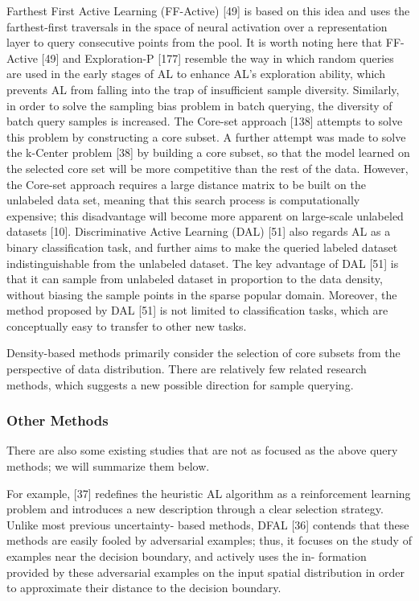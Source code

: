 Farthest First Active Learning (FF-Active) [49] is based on this idea and uses the farthest-first
traversals in the space of neural activation over a representation layer to query consecutive points
from the pool. It is worth noting here that FF-Active [49] and Exploration-P [177] resemble the
way in which random queries are used in the early stages of AL to enhance AL’s exploration
ability, which prevents AL from falling into the trap of insufficient sample diversity. Similarly, in
order to solve the sampling bias problem in batch querying, the diversity of batch query samples
is increased. The Core-set approach [138] attempts to solve this problem by constructing a core
subset. A further attempt was made to solve the k-Center problem [38] by building a core subset,
so that the model learned on the selected core set will be more competitive than the rest of the data.
However, the Core-set approach requires a large distance matrix to be built on the unlabeled data
set, meaning that this search process is computationally expensive; this disadvantage will become more apparent on large-scale unlabeled datasets [10].
Discriminative Active Learning (DAL) [51] also regards AL as a binary classification task, and further aims to make the queried labeled dataset indistinguishable from the unlabeled dataset. The key advantage of DAL [51] is that it can sample from unlabeled dataset in proportion to the data density, without biasing the sample points in the sparse popular domain. Moreover, the method proposed by DAL [51] is not limited to classification tasks, which
are conceptually easy to transfer to other new tasks.

Density-based methods primarily consider the selection of core subsets from the perspective of
data distribution. There are relatively few related research methods, which suggests a new possible
direction for sample querying.


\subsubsection{ Other Methods}

 There are also some existing studies that are not as focused as the above query methods; we will summarize them below.

For example, [37] redefines the heuristic AL algorithm as a reinforcement learning problem and
introduces a new description through a clear selection strategy. Unlike most previous uncertainty-
based methods, DFAL [36] contends that these methods are easily fooled by adversarial examples;
thus, it focuses on the study of examples near the decision boundary, and actively uses the in-
formation provided by these adversarial examples on the input spatial distribution in order to
approximate their distance to the decision boundary.

